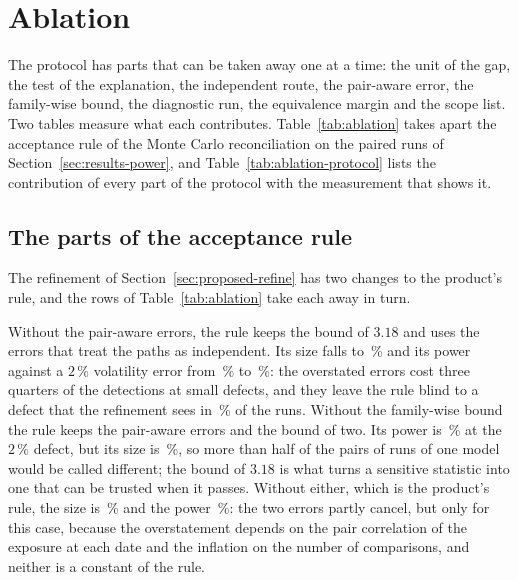 \section{Ablation}
\label{sec:ablation}

The protocol has parts that can be taken away one at a time: the unit of the gap, the test of the explanation, the independent route, the pair-aware error, the family-wise bound, the diagnostic run, the equivalence margin and the scope list. Two tables measure what each contributes. Table~\ref{tab:ablation} takes apart the acceptance rule of the Monte Carlo reconciliation on the paired runs of Section~\ref{sec:results-power}, and Table~\ref{tab:ablation-protocol} lists the contribution of every part of the protocol with the measurement that shows it.

\subsection{The parts of the acceptance rule}
\label{sec:ablation-rule}

The refinement of Section~\ref{sec:proposed-refine} has two changes to the product's rule, and the rows of Table~\ref{tab:ablation} take each away in turn.



Without the pair-aware errors, the rule keeps the bound of $3.18$ and uses the errors that treat the paths as independent. Its size falls to \nSizeSidakNetting\,\% and its power against a $2\,\%$ volatility error from \nPowerRefineSigmaTwo\,\% to \nPowerSidakSigmaTwo\,\%: the overstated errors cost three quarters of the detections at small defects, and they leave the rule blind to a defect that the refinement sees in \nPowerRefineSigmaTwo\,\% of the runs. Without the family-wise bound the rule keeps the pair-aware errors and the bound of two. Its power is \nPowerPairSigmaTwo\,\% at the $2\,\%$ defect, but its size is \nSizePairNetting\,\%, so more than half of the pairs of runs of one model would be called different; the bound of $3.18$ is what turns a sensitive statistic into one that can be trusted when it passes. Without either, which is the product's rule, the size is \nSizeProdNetting\,\% and the power \nPowerProdSigmaTwo\,\%: the two errors partly cancel, but only for this case, because the overstatement depends on the pair correlation of the exposure at each date and the inflation on the number of comparisons, and neither is a constant of the rule.

